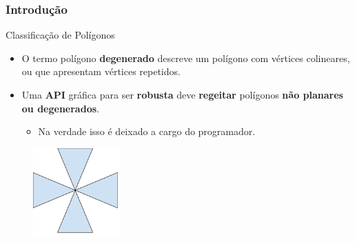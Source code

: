 \documentclass{beamer}
\begin{document}
\begin{frame}
\frametitle{Introdução}

		\begin{block}{Classificação de Polígonos}
		\begin{itemize}
			\item O termo polígono \textbf{degenerado} descreve um polígono com vértices colineares, ou que apresentam vértices repetidos.
			\item Uma \textbf{API} gráfica para ser \textbf{robusta} deve \textbf{regeitar} polígonos \textbf{não planares ou degenerados}.
			\begin{itemize}
				\item Na verdade isso é deixado a cargo do programador.
			\end{itemize}
		\end{itemize}
		\end{block}
		
		\begin{figure}[!h]
			\begin{center}
				\includegraphics[width=0.3\textwidth]{Figures/PolDeg}
			\end{center}
		\end{figure}
	
\end{frame}
\end{document}
